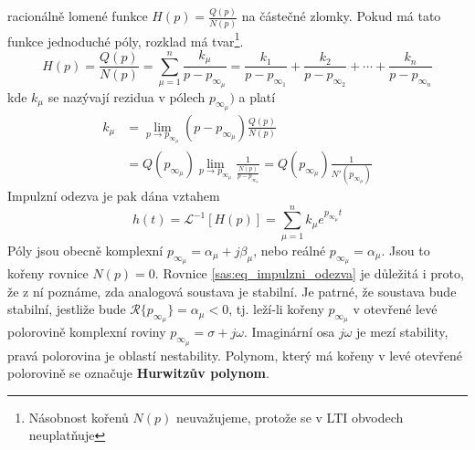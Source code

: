       racionálně lomené funkce $H(p)=\frac{Q(p)}{N(p)}$ na částečné zlomky. Pokud má tato funkce
      jednoduché póly, rozklad má tvar\footnote{Násobnost kořenů $N(p)$ neuvažujeme, protože se v LTI
      obvodech neuplatňuje}.
      \begin{equation}\label{sas:eq_HP_suma_rozklad}
         H(p)=\frac{Q(p)}{N(p)} =\sum_{\mu=1}^{n}\frac{k_\mu}{p-p_{\infty_\mu}}
             =\frac{k_1}{p-p_{\infty_1}}+\frac{k_2}{p-p_{\infty_2}}+\cdots+\frac{k_n}{p-p_{\infty_n}}
      \end{equation}
      kde $k_\mu$ se nazývají rezidua v pólech $p_{\infty_\mu})$ a platí
      \begin{align}\label{sas:eq_HP_rezidua}
        k_\mu &= \lim_{p\to p_{\infty_\mu}}(p-p_{\infty_\mu})\frac{Q(p)}{N(p)}        \\
        \,    &= Q(p_{\infty_\mu})\lim_{p\to
                 p_{\infty_\mu}}\frac{1}{\frac{N(p)}{p-p_{\infty_\mu}}}=
                 Q(p_{\infty_\mu})\frac{1}{N'(p_{\infty_\mu})}
      \end{align}
      Impulzní odezva je pak dána vztahem
      \begin{equation}\label{sas:eq_impulzni_odezva}
        h(t)=\mathcal{L}^{-1}[H(p)]=\sum_{\mu=1}^nk_\mu e^{p_{\infty_\mu}t}
      \end{equation}
      Póly jsou obecně komplexní $p_{\infty_{\mu}}=\alpha_\mu+j\beta_\mu$, nebo reálné
      $p_{\infty_{\mu}}=\alpha_\mu$. Jsou to kořeny rovnice $N(p)=0$. Rovnice
      \ref{sas:eq_impulzni_odezva} je důležitá i proto, že z ní poznáme, zda analogová soustava je
      stabilní. Je patrné, že soustava bude stabilní, jestliže bude
      $\mathcal{R}\{p_{\infty_{\mu}}\}=\alpha_\mu<0$, tj. leží-li kořeny $p_{\infty_{\mu}}$ v
      otevřené levé polorovině komplexní roviny $p_{\infty_{\mu}}=\sigma+j\omega$. Imaginární osa
      $j\omega$ je mezí stability, pravá polorovina je oblastí nestability. Polynom, který má kořeny
      v levé otevřené polorovině se označuje \textbf{Hurwitzův polynom}.

